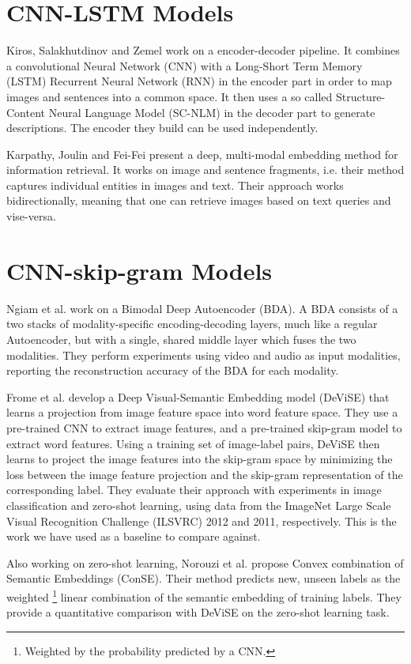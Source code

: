 \documentclass[a4paper]{standalone}
\begin{document}
\section{CNN-LSTM Models}
Kiros, Salakhutdinov and Zemel \cite{Kiros2014} work on a encoder-decoder pipeline. It combines a convolutional Neural Network (CNN) with a Long-Short Term Memory (LSTM) Recurrent Neural Network (RNN) in the encoder part in order to map images and sentences into a common space. It then uses a so called Structure-Content Neural Language Model (SC-NLM) in the decoder part to generate descriptions. The encoder they build can be used independently.

Karpathy, Joulin and Fei-Fei \cite{karpathy2014deep} present a deep, multi-modal embedding method for information retrieval. It works on image and sentence fragments, i.e. their method captures individual entities in images and text. Their approach works bidirectionally, meaning that one can retrieve images based on text queries and vise-versa.

\section{CNN-skip-gram Models}
Ngiam et al. \cite{ngiam2011multimodal} work on a Bimodal Deep Autoencoder (BDA). A BDA consists of a two stacks of modality-specific encoding-decoding layers, much like a regular Autoencoder, but with a single, shared middle layer which fuses the two modalities. They perform experiments using video and audio as input modalities, reporting the reconstruction accuracy of the BDA for each modality.

Frome et al. \cite{frome2013devise} develop a Deep Visual-Semantic Embedding model (DeViSE) that learns a projection from image feature space into word feature space. They use a pre-trained CNN to extract image features, and a pre-trained skip-gram model \cite{Mikolov2013,mikolov2013distributed} to extract word features. Using a training set of image-label pairs, DeViSE then learns to project the image features into the skip-gram space by minimizing the loss between the image feature projection and the skip-gram representation of the corresponding label. They evaluate their approach with experiments in image classification and zero-shot learning, using data from the ImageNet Large Scale Visual Recognition Challenge (ILSVRC) \cite{ILSVRC15} 2012 and 2011, respectively. This is the work we have used as a baseline to compare against.

Also working on zero-shot learning, Norouzi et al. \cite{norouzi2013zero} propose Convex combination of Semantic Embeddings (ConSE). Their method predicts new, unseen labels as the weighted \footnote{Weighted by the probability predicted by a CNN.} linear combination of the semantic embedding of training labels. They provide a quantitative comparison with DeViSE on the zero-shot learning task.
\end{document}
